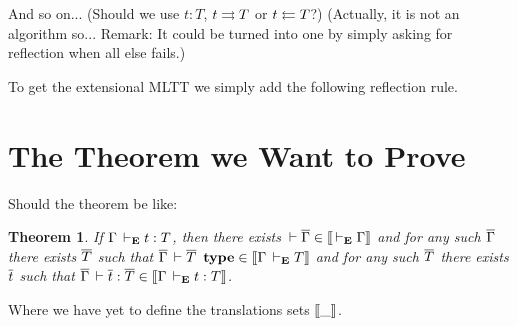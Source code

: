 \documentclass{amsart}
\newtheorem{theorem}{Theorem}[section]
\begin{document}
\begin{mathc}
  \qquad
\end{mathc}


\begin{mathc}
\end{mathc}

\begin{mathc}
\end{mathc}
%
And so on... (Should we use $t : T$, $t \rightrightarrows T$ or $t \leftleftarrows T$?)
(Actually, it is not an algorithm so... Remark: It could be turned into one
by simply asking for reflection when all else fails.)

To get the extensional MLTT we simply add the following reflection rule.
%
\begin{mathc}
\end{mathc}


\section{The Theorem we Want to Prove}

Should the theorem be like:

\begin{theorem}
  If $\Gamma \,\vdash_\mathbf{E} t : T$, then there exists
  $\,\vdash \overline{\Gamma} \in \mathopen{{[\kern-0.14em[}} \,\vdash_\mathbf{E} \Gamma \mathclose{{]\kern-0.14em]}}$ and for any such $\overline{\Gamma}$ there exists
  $\overline{T}$ such that $\overline{\Gamma} \,\vdash \overline{T}\ \operatorname{\mathbf{type}} \in \mathopen{{[\kern-0.14em[}} \Gamma \,\vdash_\mathbf{E} T \mathclose{{]\kern-0.14em]}}$
  and for any such $\overline{T}$ there exists $\overline{t}$ such that
  $\overline{\Gamma} \,\vdash \overline{t} : \overline{T} \in \mathopen{{[\kern-0.14em[}} \Gamma \,\vdash_\mathbf{E} t : T \mathclose{{]\kern-0.14em]}}$.
\end{theorem}
%
Where we have yet to define the translations sets $\mathopen{{[\kern-0.14em[}} \_ \mathclose{{]\kern-0.14em]}}$.
\end{document}
